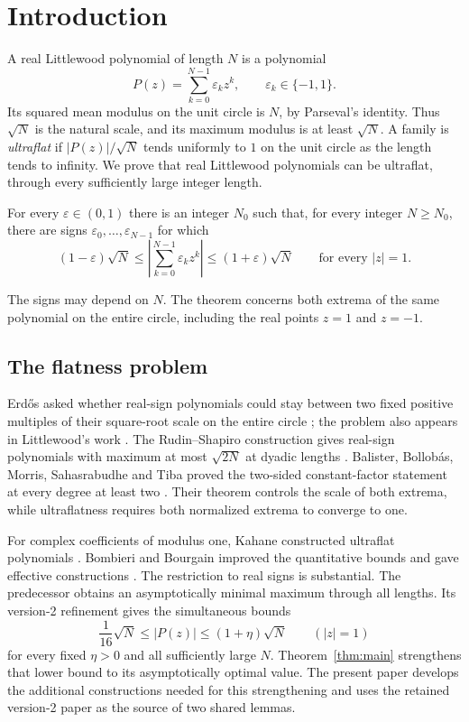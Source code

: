 \section{Introduction}\label{sec:introduction}

A real Littlewood polynomial of length $N$ is a polynomial
\[
 P(z)=\sum_{k=0}^{N-1}\varepsilon_k z^k,
 \qquad \varepsilon_k\in\{-1,1\}.
\]
Its squared mean modulus on the unit circle is $N$, by Parseval's
identity. Thus $\sqrt N$ is the natural scale, and its maximum modulus
is at least $\sqrt N$. A family is \emph{ultraflat} if
$|P(z)|/\sqrt N$ tends uniformly to $1$ on the unit circle as the
length tends to infinity. We prove that real Littlewood polynomials
can be ultraflat, through every sufficiently large integer length.

\begin{theorem}\label{thm:main}
For every $\varepsilon\in(0,1)$ there is an integer $N_0$ such that,
for every integer $N\ge N_0$, there are signs
$\varepsilon_0,\ldots,\varepsilon_{N-1}$ for which
\[
 (1-\varepsilon)\sqrt N
 \le\left|\sum_{k=0}^{N-1}\varepsilon_k z^k\right|
 \le(1+\varepsilon)\sqrt N
 \qquad\text{for every }|z|=1.
\]
\end{theorem}

The signs may depend on $N$. The theorem concerns both extrema of the
same polynomial on the entire circle, including the real points
$z=1$ and $z=-1$.

\subsection{The flatness problem}

Erd\H{o}s asked whether real-sign polynomials could stay between two
fixed positive multiples of their square-root scale on the entire
circle \cite[Problem~26]{Erdos1957}; the problem also appears in
Littlewood's work \cite{Littlewood1966}. The Rudin--Shapiro construction
gives real-sign polynomials with maximum at most $\sqrt{2N}$ at dyadic
lengths \cite{Rudin1959}. Balister, Bollob\'as, Morris, Sahasrabudhe and
Tiba proved the two-sided constant-factor statement at every degree
at least two \cite[Theorem~1.1]{BalisterEtAl2020}. Their theorem controls
the scale of both extrema, while ultraflatness requires both normalized
extrema to converge to one.

For complex coefficients of modulus one, Kahane constructed ultraflat
polynomials \cite{Kahane1980}. Bombieri and Bourgain improved the
quantitative bounds and gave effective constructions
\cite[Theorems~4 and~7]{BombieriBourgain2009}. The restriction to real
signs is substantial. The predecessor \cite[Theorem~1.1]{OpenAIMinimal}
obtains an asymptotically minimal maximum through all lengths. Its
version-2 refinement \cite[Theorem~1.1]{OpenAILowerEnvelope2026} gives
the simultaneous bounds
\[
 \frac1{16}\sqrt N\le |P(z)|\le(1+\eta)\sqrt N
 \qquad(|z|=1)
\]
for every fixed $\eta>0$ and all sufficiently large $N$.
Theorem~\ref{thm:main} strengthens that lower bound to its asymptotically
optimal value. The present paper develops the additional constructions
needed for this strengthening and uses the retained version-2 paper
as the source of two shared lemmas.

